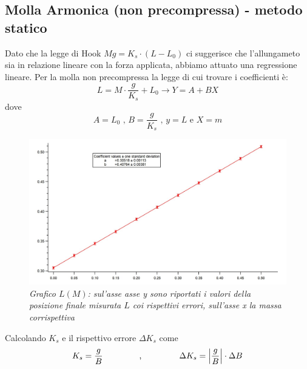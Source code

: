 \documentclass[12pt, a4paper]{article}
\begin{document}
\subsection{Molla Armonica (non precompressa) - metodo statico}
Dato che la legge di Hook $Mg=K_s\cdot(L-L_0)$ ci suggerisce che l'allungameto sia in relazione lineare con la forza applicata, abbiamo attuato una regressione lineare. 
Per la molla non precompressa la legge di cui trovare i coefficienti è: 
\begin{equation*}
    L=M\cdot\displaystyle\frac{g}{K_s}+L_0
    \xrightarrow{} Y = A + BX
\end{equation*} 
dove\\ 
\begin{equation*}
 A= L_0 \mbox{ , } B=\displaystyle\frac{g}{K_s} \mbox{ , } y = L \mbox{ e } X = m
\end{equation*}



\begin{figure}[h]
\includegraphics[width=170mm]{IMMAGINI/Graph Molla Arm Stat.jpg}
\centering
\caption{\textit{{\footnotesize{Grafico $L(M)$}: sul'asse asse \textit{y} sono riportati i valori della posizione finale misurata $L$ coi rispettivi errori, sull'asse \textit{x} la massa corrispettiva}}}
\label{Grafico parabolico}
\end{figure}


\bigskip
\bigskip


Calcolando $K_s$ e il rispettivo errore $\Delta K_s$ come\\

\begin{equation*}
\centering
    K_s= \frac{g}{B} \text{\phantom{Testo invi}} \text{,} \text{\phantom{Testo sibil}} \Delta K_s = \left | \frac{g}{B}  \right | \cdot \Delta B 
\end{equation*}
\bigskip
\end{document}
